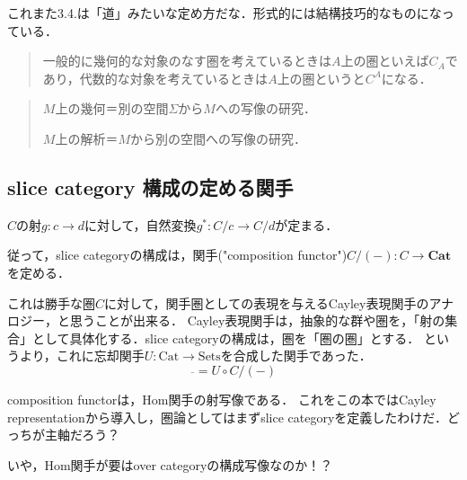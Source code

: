 \documentclass[uplatex, dvipdfmx]{jsarticle}
\begin{document}
\begin{remark*}
    これまた3.4.は「道」みたいな定め方だな．形式的には結構技巧的なものになっている．
    \begin{quote}
        一般的に幾何的な対象のなす圏を考えているときは$A$上の圏といえば$C_A$であり，代数的な対象を考えているときは$A$上の圏というと$C^A$になる．
    \end{quote}
\end{remark*}
\begin{remark*}[Gromov]
    \begin{definition*}
        \begin{quotation}
            $M$上の幾何＝別の空間$\Sigma$から$M$への写像の研究．

            $M$上の解析＝$M$から別の空間への写像の研究．
        \end{quotation}
    \end{definition*}
\end{remark*}

\subsection*{slice category 構成の定める関手}

$C$の射$g:c\to d$に対して，自然変換$g^*:C/c\to C/d$が定まる．
\begin{center}\end{center}

従って，slice categoryの構成は，関手("composition functor")$C/(-):C\to \mathbf{Cat}$を定める．

これは勝手な圏$C$に対して，関手圏としての表現を与えるCayley表現関手のアナロジー，と思うことが出来る．
Cayley表現関手は，抽象的な群や圏を，「射の集合」として具体化する．slice categoryの構成は，圏を「圏の圏」とする．
というより，これに忘却関手$U:\mathrm{Cat}\to\mathrm{Sets}$を合成した関手であった．
\[ \overline{　} = U\circ C/(-) \]

\begin{remark*}
    composition functorは，Hom関手の射写像である．
    これをこの本ではCayley representationから導入し，圏論としてはまずslice categoryを定義したわけだ．どっちが主軸だろう？

    いや，Hom関手が要はover categoryの構成写像なのか！？
\end{remark*}
\end{document}
